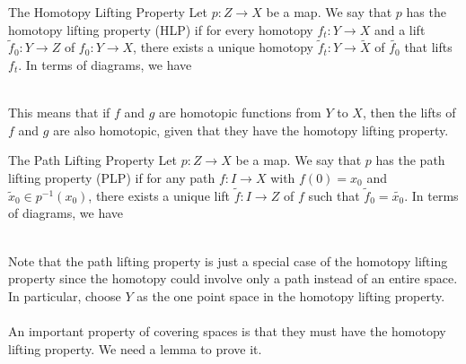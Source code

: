 \documentclass[a4paper]{article}
\begin{document}
\begin{defn}{The Homotopy Lifting Property}{} Let $p:Z\to X$ be a map. We say that $p$ has the homotopy lifting property (HLP) if for every homotopy $f_t:Y\to X$ and a lift $\tilde{f}_0:Y\to Z$ of $f_0:Y\to X$, there exists a unique homotopy $\tilde{f}_t:Y\to\tilde{X}$ of $\tilde{f_0}$ that lifts $f_t$. In terms of diagrams, we have \\~\\
\end{defn}

This means that if $f$ and $g$ are homotopic functions from $Y$ to $X$, then the lifts of $f$ and $g$ are also homotopic, given that they have the homotopy lifting property. 

\begin{defn}{The Path Lifting Property}{} Let $p:Z\to X$ be a map. We say that $p$ has the path lifting property (PLP) if for any path $f:I\to X$ with $f(0)=x_0$ and $\tilde{x}_0\in p^{-1}(x_0)$, there exists a unique lift $\tilde{f}:I\to Z$ of $f$ such that $\tilde{f}_0=\tilde{x_0}$. In terms of diagrams, we have \\~\\
\end{defn}

Note that the path lifting property is just a special case of the homotopy lifting property since the homotopy could involve only a path instead of an entire space. In particular, choose $Y$ as the one point space in the homotopy lifting property. \\~\\

An important property of covering spaces is that they must have the homotopy lifting property. We need a lemma to prove it. 
\end{document}
